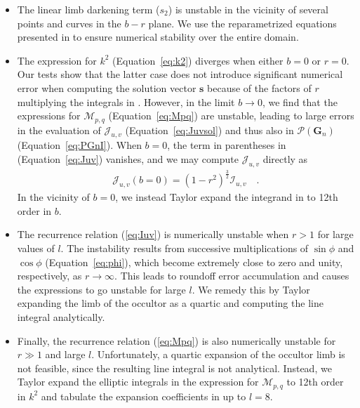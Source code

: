 \documentclass[modern]{aastex61}
\begin{document}
{\begin{itemize}
\item The linear limb darkening term ($s_2$) is unstable in the vicinity of several
points and curves in the $b-r$ plane. We use the reparametrized equations presented in
\citet{limbdark} to ensure numerical stability over the entire domain.
%
\item The expression for $k^2$ (Equation~\ref{eq:k2}) diverges when either $b = 0$
or $r = 0$. Our tests show that the latter case does not introduce significant numerical
error when computing the solution vector $\mathbf{s}$ because of the factors of $r$
multiplying the integrals in . However, in the limit $b \rightarrow 0$,
we find that the expressions for $\mathcal{M}_{p,q}$ (Equation~\ref{eq:Mpq}) are unstable,
leading to large errors in the evaluation of $\mathcal{J}_{u,v}$ (Equation~\ref{eq:Juvsol})
and thus also in $\mathcal{P}(\mathbf{G}_n)$ (Equation~\ref{eq:PGnI}). When $b = 0$, the term in
parentheses in (Equation~\ref{eq:Juv}) vanishes, and we may compute $\mathcal{J}_{u,v}$
directly as
%
\begin{align}
    \mathcal{J}_{u,v}(b = 0) = (1 - r^2)^\frac{3}{2} \mathcal{I}_{u,v} \quad.
\end{align}
%
In the vicinity of $b = 0$, we instead Taylor expand the integrand in  to 12th order in $b$.
%
\item The recurrence relation (\ref{eq:Iuv}) is numerically unstable when $r > 1$ for large values of $l$. The
instability results from successive multiplications of $\sin\phi$  and $\cos\phi$ (Equation~\ref{eq:phi}),
which become extremely close to zero and unity, respectively, as $r \rightarrow \infty$. This leads
to roundoff error accumulation and causes the expressions to go unstable for large $l$.
We remedy this by Taylor expanding the limb of the occultor as a quartic and computing the line integral
analytically.
%
\item Finally, the recurrence relation (\ref{eq:Mpq}) is also numerically unstable for $r \gg 1$ and large $l$.
Unfortunately, a quartic expansion of the occultor limb is not feasible, since the resulting line
integral is not analytical. Instead, we Taylor expand the elliptic integrals in the expression for $\mathcal{M}_{p,q}$
to 12th order in $k^2$ and tabulate the expansion coefficients in \starry up to $l = 8$.
\end{itemize}

}
\end{document}
